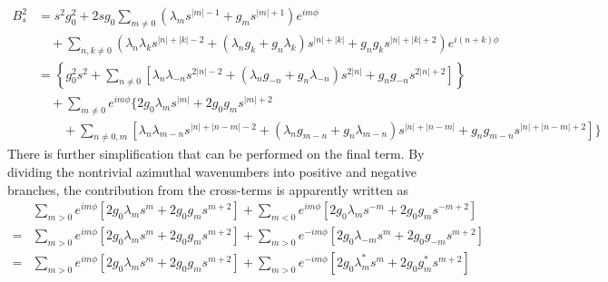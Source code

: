 \begin{equation}
\begin{aligned}
    B_s^2 &= s^2 g_0^2 + 2s g_0 \sum_{m\neq 0} \left(\lambda_m s^{|m|-1} + g_m s^{|m|+1}\right) e^{im\phi} \\
    &\quad + \sum_{n,k\neq 0} \left(\lambda_n \lambda_k s^{|n|+|k|-2} + \left(\lambda_n g_k + g_n \lambda_k\right) s^{|n| + |k|} + g_n g_k s^{|n|+|k|+2} \right) e^{i(n+k)\phi} \\ 
    &= \left\{g_0^2 s^2 + \sum_{n\neq 0} \left[\lambda_n \lambda_{-n} s^{2|n|-2} + \left(\lambda_n g_{-n} + g_n \lambda_{-n}\right) s^{2|n|} + g_n g_{-n}  s^{2|n|+ 2} \right]\right\} \\ 
    &\quad + \sum_{m\neq 0} e^{im\phi} \Bigg\{2g_0 \lambda_m s^{|m|} + 2 g_0 g_m s^{|m|+2} \\
    &\qquad + \sum_{n\neq 0, m} \left[\lambda_n\lambda_{m-n} s^{|n|+|n-m|-2} + \left(\lambda_n g_{m-n} + g_n \lambda_{m-n}\right)s^{|n|+|n-m|} + g_n g_{m-n} s^{|n|+|n-m|+2}\right] \Bigg\}
\end{aligned}
\end{equation}
There is further simplification that can be performed on the final term. By dividing the nontrivial azimuthal wavenumbers into positive and negative branches, the contribution from the cross-terms is apparently written as
\begin{equation}
\begin{aligned}
    &\sum_{m > 0} e^{im\phi} \left[2 g_0 \lambda_m s^m + 2g_0 g_m s^{m+2}\right] + \sum_{m<0} e^{im\phi} \left[2 g_0 \lambda_m s^{-m} + 2g_0 g_m s^{-m+2}\right] \\ 
    =& \sum_{m > 0} e^{im\phi} \left[2 g_0 \lambda_m s^m + 2g_0 g_m s^{m+2}\right] +\sum_{m>0} e^{-im\phi} \left[2 g_0 \lambda_{-m} s^m + 2g_0 g_{-m} s^{m+2}\right] \\
    =& \sum_{m > 0} e^{im\phi} \left[2 g_0 \lambda_m s^m + 2g_0 g_m s^{m+2}\right] +\sum_{m>0} e^{-im\phi} \left[2 g_0 \lambda_m^* s^m + 2g_0 g_m^* s^{m+2}\right]
\end{aligned}
\end{equation}
